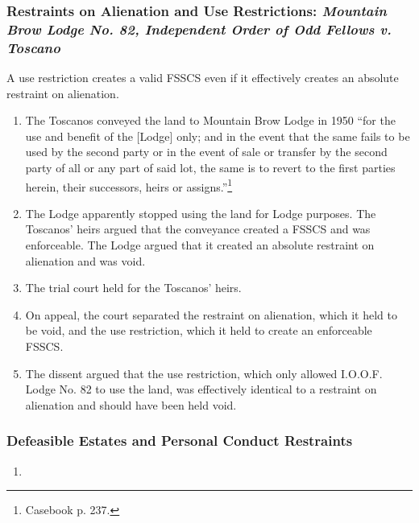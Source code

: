 \subsubsection{Restraints on Alienation and Use Restrictions: \emph{Mountain 
Brow Lodge No. 82, Independent Order of Odd Fellows v. Toscano}}

A use restriction creates a valid FSSCS even if it effectively creates an 
absolute restraint on alienation.

\begin{enumerate}
    \item The Toscanos conveyed the land to Mountain Brow Lodge in 1950 ``for 
    the use and benefit of the [Lodge] only; and in the event that the same 
    fails to be used by the second party or in the event of sale or transfer 
    by the second party of all or any part of said lot, the same is to revert 
    to the first parties herein, their successors, heirs or 
    assigns.''\footnote{Casebook p. 237.}
    \item The Lodge apparently stopped using the land for Lodge purposes. The 
    Toscanos' heirs argued that the conveyance created a FSSCS and was 
    enforceable. The Lodge argued that it created an absolute restraint on 
    alienation and was void.
    \item The trial court held for the Toscanos' heirs.
    \item On appeal, the court separated the restraint on alienation, which it 
    held to be void, and the use restriction, which it held to create an 
    enforceable FSSCS.
    \item The dissent argued that the use restriction, which only allowed 
    I.O.O.F. Lodge No. 82 to use the land, was effectively identical to a 
    restraint on alienation and should have been held void.
\end{enumerate}

\subsubsection{Defeasible Estates and Personal Conduct Restraints}

\begin{enumerate}
    \item %
\end{enumerate}

